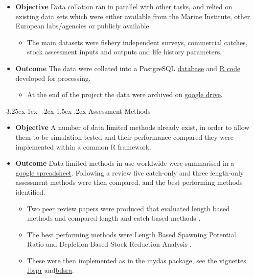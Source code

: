 \documentclass[a4paper, 10pt]{article}
\makeatletter
\renewcommand{\subsection}{\@startsection{subsection}{2}{\z@}%
 {-3.25ex\@plus -1ex \@minus -.2ex}%
 {1.5ex \@plus .2ex}%
 {\normalfont\bfseries\slshape}}
\makeatother
\begin{document}
\begin{itemize}[labelindent=\parindent,noitemsep,topsep=0pt,parsep=0pt,partopsep=0pt]
 \item \textbf{Objective} Data collation ran in parallel with other tasks, and relied on existing data sets which were either available from the Marine Institute, other European labs/agencies or publicly available. 
 \begin{itemize} \item The main datasets were fishery independent surveys, commercial catches, stock assessment inputs and outputs and life history parameters.
 \end{itemize}
 \item \textbf{Outcome} The data were collated into a PostgreSQL \hyperref[appendix:db]{database} and  \hyperref[appendix:datsets]{R code} developed for processing. 
 \begin{itemize}
    \item At the end of the project the data were archived on \href{https://3o2y9wugzp1kfxr5hvzgzq-on.drv.tw/MyDas/db.html}{google drive}.
 \end{itemize}
\end{itemize}

\subsection{Assessment Methods}

\begin{itemize}[labelindent=\parindent,noitemsep,topsep=0pt,parsep=0pt,partopsep=0pt]
 \item \textbf{Objective} A number of data limited methods already exist, in order to allow them to be simulation tested and their performance compared they were implemented within a common R framework.    
 \item \textbf{Outcome} Data limited methods in use worldwide were summarised in a \href{https://docs.google.com/spreadsheets/d/17_qQdzDY41ZrL0yT6QtHpUR4_ydxx_xfCh4GiDqYymU/edit?usp=sharing}{google spreadsheet}. Following a review five catch-only and three length-only assessment methods were then compared, and the best performing methods identified.  
 \begin{itemize}
 \item Two peer review papers were produced that evaluated length based methods \citep{pons2019performance} and compared length and catch based methods \citep{pons2019catchlen}.
 \item  The best performing methods were Length Based Spawning Potential Ratio \citep[LBSPR][]{hordyk2014novel} and Depletion Based  Stock Reduction Analysis \citep[DBSRA][]{dick2011depletion}. 
 \item These were then implemented as in the mydas package, see the vignettes \href{https://3o2y9wugzp1kfxr5hvzgzq-on.drv.tw/MyDas/tasks/4/simtest-lbspr.html}{lbspr} and\href{https://3o2y9wugzp1kfxr5hvzgzq-on.drv.tw/MyDas/tasks/4/simtest-bdsra.html}{bdsra}.
 \end{itemize}
\end{itemize}
\end{document}
